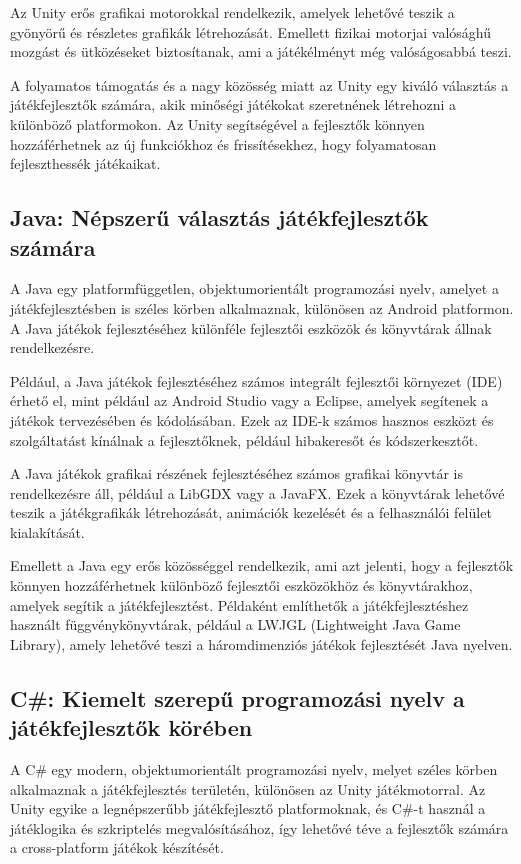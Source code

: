 Az Unity erős grafikai motorokkal rendelkezik, amelyek lehetővé teszik a gyönyörű és részletes grafikák létrehozását. Emellett fizikai motorjai valósághű mozgást és ütközéseket biztosítanak, ami a játékélményt még valóságosabbá teszi.

A folyamatos támogatás és a nagy közösség miatt az Unity egy kiváló választás a játékfejlesztők számára, akik minőségi játékokat szeretnének létrehozni a különböző platformokon. Az Unity segítségével a fejlesztők könnyen hozzáférhetnek az új funkciókhoz és frissítésekhez, hogy folyamatosan fejleszthessék játékaikat.
\subsection{Java: Népszerű választás játékfejlesztők számára}\cite{java-doc}
A Java egy platformfüggetlen, objektumorientált programozási nyelv, amelyet a játékfejlesztésben is széles körben alkalmaznak, különösen az Android platformon. A Java játékok fejlesztéséhez különféle fejlesztői eszközök és könyvtárak állnak rendelkezésre.

Például, a Java játékok fejlesztéséhez számos integrált fejlesztői környezet (IDE) érhető el, mint például az Android Studio vagy a Eclipse, amelyek segítenek a játékok tervezésében és kódolásában. Ezek az IDE-k számos hasznos eszközt és szolgáltatást kínálnak a fejlesztőknek, például hibakeresőt és kódszerkesztőt.

A Java játékok grafikai részének fejlesztéséhez számos grafikai könyvtár is rendelkezésre áll, például a LibGDX vagy a JavaFX. Ezek a könyvtárak lehetővé teszik a játékgrafikák létrehozását, animációk kezelését és a felhasználói felület kialakítását.

Emellett a Java egy erős közösséggel rendelkezik, ami azt jelenti, hogy a fejlesztők könnyen hozzáférhetnek különböző fejlesztői eszközökhöz és könyvtárakhoz, amelyek segítik a játékfejlesztést. Példaként említhetők a játékfejlesztéshez használt függvénykönyvtárak, például a LWJGL (Lightweight Java Game Library), amely lehetővé teszi a háromdimenziós játékok fejlesztését Java nyelven.
\subsection{C\#: Kiemelt szerepű programozási nyelv a játékfejlesztők körében}\cite{csharp-doc}

A C\# egy modern, objektumorientált programozási nyelv, melyet széles körben alkalmaznak a játékfejlesztés területén, különösen az Unity játékmotorral. Az Unity egyike a legnépszerűbb játékfejlesztő platformoknak, és C\#-t használ a játéklogika és szkriptelés megvalósításához, így lehetővé téve a fejlesztők számára a cross-platform játékok készítését.

